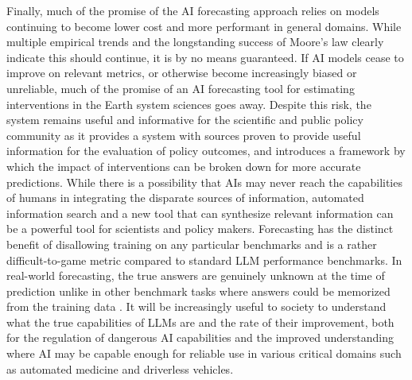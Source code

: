 \documentclass[12pt,a4paper]{article}
\begin{document}
Finally, much of the promise of the AI forecasting approach relies on models continuing to become lower cost and more performant in general domains. While multiple empirical trends and the longstanding success of Moore's law clearly indicate this should continue, it is by no means guaranteed. If AI models cease to improve on relevant metrics, or otherwise become increasingly biased or unreliable, much of the promise of an AI forecasting tool for estimating interventions in the Earth system sciences goes away. Despite this risk, the system remains useful and informative for the scientific and public policy community as it provides a system with sources proven to provide useful information for the evaluation of policy outcomes, and introduces a framework by which the impact of interventions can be broken down for more accurate predictions. While there is a possibility that AIs may never reach the capabilities of humans in integrating the disparate sources of information, automated information search and a new tool that can synthesize relevant information can be a powerful tool for scientists and policy makers.
Forecasting has the distinct benefit of disallowing training on any particular benchmarks and is a rather difficult-to-game metric compared to standard LLM performance benchmarks. In real-world forecasting, the true answers are genuinely unknown at the time of prediction unlike in other benchmark tasks where answers could be memorized from the training data . It will be increasingly useful to society to understand what the true capabilities of LLMs are and the rate of their improvement, both for the regulation of dangerous AI capabilities and the improved understanding where AI may be capable enough for reliable use in various critical domains such as automated medicine and driverless vehicles.
\end{document}
